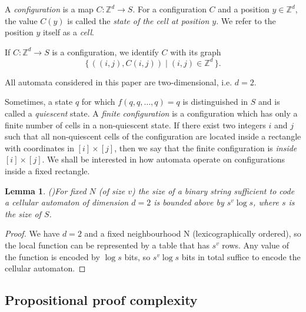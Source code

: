 \documentclass{article}
\theoremstyle{plain}
\newtheorem{lemma}[theorem]{Lemma}
\theoremstyle{definition}
\begin{document}
A \emph{configuration} is a map 
$C : \mathbb{Z}^d \to S$.
For a configuration $C$ and a position $y \in \mathbb{Z}^d$, 
the value $C(y)$ is called the \emph{state of the cell at position $y$}.  
We refer to the position $y$ itself as a \emph{cell}.

If $C : \mathbb{Z}^d \to S$ is a configuration, we identify $C$
with its graph
\[
\{\, ((i,j), C(i,j)) \mid (i,j) \in \mathbb{Z}^d \,\}.
\]

All automata considered in this paper are two-dimensional, i.e. $d=2$.

Sometimes, a state $q$ for which $f(q, q, \dots, q) = q$ is distinguished
in $S$ and is called
a \emph{quiescent} state. A \emph{finite configuration} is a configuration which has only a finite number of cells in a non-quiescent state. If there exist two integers $i$ and $j$ such that all non-quiescent cells of the
configuration are located inside a rectangle with coordinates in $[i] \times [j]$, then we say that the
finite configuration
is \emph{inside $[i] \times [j]$}. We shall be interested in how automata operate on configurations inside a fixed rectangle.

\begin{lemma}(\cite{DURAND1994387})\label{lm:CA_bound}
     For fixed $N$ (of size $v$) the size of a binary string sufficient to code a cellular automaton of dimension $d=2$ is bounded above by $s^v\log s$, where $s$ is the size of $S$.
\end{lemma}
\begin{proof}
We have $d=2$ and a fixed neighbourhood N
(lexicographically ordered), so the local function can be represented by a table that has $s^v$ rows. Any value of the function is encoded by $\log s$ bits, so $s^v \log s$ bits in total suffice to encode the cellular automaton.
\end{proof}



\subsection{Propositional proof complexity}
\end{document}
